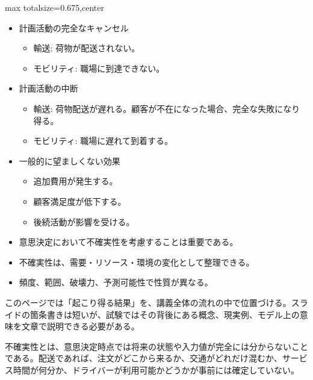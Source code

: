 \clearpage
{}
\begin{adjustbox}{max totalsize={\textwidth}{0.675\textheight},center}
\begin{minipage}{\textwidth}\scriptsize
\begin{minipage}[t]{0.485\textwidth}
\begin{itemize}
\item 計画活動の完全なキャンセル
\begin{itemize}
\item 輸送: 荷物が配送されない。
\item モビリティ: 職場に到達できない。
\end{itemize}
\item 計画活動の中断
\begin{itemize}
\item 輸送: 荷物配送が遅れる。顧客が不在になった場合、完全な失敗になり得る。
\item モビリティ: 職場に遅れて到着する。
\end{itemize}
\item 一般的に望ましくない効果
\begin{itemize}
\item 追加費用が発生する。
\item 顧客満足度が低下する。
\item 後続活動が影響を受ける。
\end{itemize}
\item 意思決定において不確実性を考慮することは重要である。
\end{itemize}
\begin{itemize}
\item 不確実性は、需要・リソース・環境の変化として整理できる。
\item 頻度、範囲、破壊力、予測可能性で性質が異なる。
\end{itemize}
\end{minipage}\hfill
\begin{minipage}[t]{0.485\textwidth}
このページでは「起こり得る結果」を、講義全体の流れの中で位置づける。スライドの箇条書きは短いが、試験ではその背後にある概念、現実例、モデル上の意味を文章で説明できる必要がある。\par
不確実性とは、意思決定時点では将来の状態や入力値が完全には分からないことである。配送であれば、注文がどこから来るか、交通がどれだけ混むか、サービス時間が何分か、ドライバーが利用可能かどうかが事前には確定していない。\par

\end{minipage}
\end{minipage}
\end{adjustbox}
